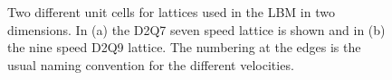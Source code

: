 \begin{figure}
  \centering
  \hspace{5pt}
  \caption{Two different unit cells for lattices used in the LBM in two
    dimensions. In (a) the D2Q7 seven speed lattice is shown and in
    (b) the nine speed D2Q9 lattice. The numbering at the edges is the
    usual naming convention for the different velocities.}
  \label{fig:lbm:lattices}
\end{figure}
